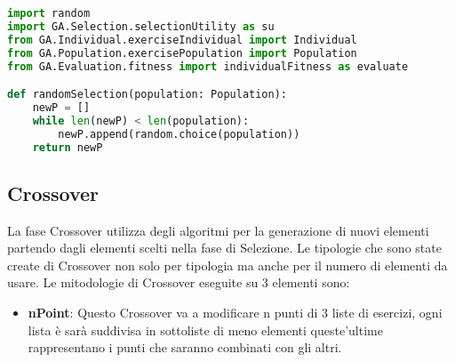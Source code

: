 \documentclass{article}
\begin{document}
\begin{lstlisting}[language=Python, breaklines, no caption]
import random
import GA.Selection.selectionUtility as su
from GA.Individual.exerciseIndividual import Individual
from GA.Population.exercisePopulation import Population
from GA.Evaluation.fitness import individualFitness as evaluate

def randomSelection(population: Population):
    newP = []
    while len(newP) < len(population):
        newP.append(random.choice(population))
    return newP
        \end{lstlisting}

    \subsection{Crossover}
    La fase Crossover utilizza degli algoritmi per la generazione di nuovi elementi partendo dagli elementi scelti nella fase di Selezione.
    Le tipologie che sono state create di Crossover non solo per tipologia ma anche per il numero di elementi da usare.
    Le mitodologie di Crossover eseguite su 3 elementi sono:

\begin{itemize}
\item\textbf{nPoint}: Questo Crossover va a modificare n punti di 3 liste di esercizi, ogni lista è sarà suddivisa in sottoliste di meno elementi queste'ultime rappresentano i punti che saranno combinati con gli altri.
\end{itemize}
\end{document}
